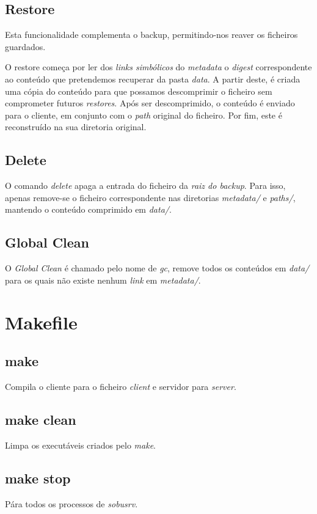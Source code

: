 \documentclass[12pt,a4paper]{report}
\begin{document}
\section{Restore}
Esta funcionalidade complementa o backup, permitindo-nos reaver os ficheiros guardados.\par O restore começa por ler dos \emph{links simbólicos} do \emph{metadata} o \emph{digest} correspondente ao conteúdo que pretendemos recuperar da pasta \emph{data}. A partir deste, é criada uma cópia do conteúdo para que possamos descomprimir o ficheiro sem comprometer futuros \emph{restores}. Após ser descomprimido, o conteúdo é enviado para o cliente, em conjunto com o \emph{path} original do ficheiro. Por fim, este é reconstruído na sua diretoria original.

\section{Delete}
O comando \emph{delete} apaga a entrada do ficheiro da \emph{raiz do backup}. Para isso, apenas remove-se o ficheiro correspondente nas diretorias \emph{metadata/} e \emph{paths/}, mantendo o conteúdo comprimido em \emph{data/}.

\section{Global Clean}
O \emph{Global Clean} é chamado pelo nome de \emph{gc}, remove todos os conteúdos em \emph{data/} para os quais não existe nenhum \emph{link} em \emph{metadata/}.

\chapter{Makefile}
\section{make}
Compila o cliente para o ficheiro \emph{client} e servidor para \emph{server}.

\section{make clean}
Limpa os executáveis criados pelo \emph{make}.

\section{make stop}
Pára todos os processos de \emph{sobusrv}.
\end{document}
